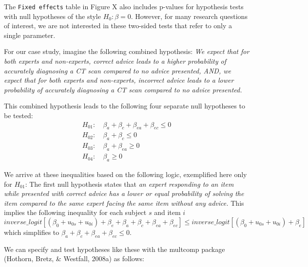 \documentclass[
  man,floatsintext]{apa6}
\newenvironment{Shaded}{\begin{snugshade}}{\end{snugshade}}
\newcommand{\AttributeTok}[1]{\textcolor[rgb]{0.13,0.29,0.53}{#1}}
\newcommand{\FunctionTok}[1]{\textcolor[rgb]{0.13,0.29,0.53}{\textbf{#1}}}
\newcommand{\NormalTok}[1]{#1}
\newcommand{\OtherTok}[1]{\textcolor[rgb]{0.56,0.35,0.01}{#1}}
\newcommand{\SpecialCharTok}[1]{\textcolor[rgb]{0.81,0.36,0.00}{\textbf{#1}}}
\newcommand{\StringTok}[1]{\textcolor[rgb]{0.31,0.60,0.02}{#1}}
\begin{document}
The \texttt{Fixed\ effects} table in Figure X also includes p-values for hypothesis tests with null hypotheses of the style \(H_0: \beta = 0\). However, for many research questions of interest, we are not interested in these two-sided tests that refer to only a single parameter.

For our case study, imagine the following combined hypothesis: \emph{We expect that for both experts and non-experts, correct advice leads to a higher probability of accurately diagnosing a CT scan compared to no advice presented, AND, we expect that for both experts and non-experts, incorrect advice leads to a lower probability of accurately diagnosing a CT scan compared to no advice presented.}

This combined hypothesis leads to the following four separate null hypotheses to be tested: \[
\begin{aligned}
H_{01}:\ &\beta_{a} + \beta_{c} + \beta_{ea} + \beta_{ec} \leq 0 \\
H_{02}:\ &\beta_{a} + \beta_{c} \leq 0 \\
H_{03}:\ &\beta_{a} + \beta_{ea} \geq 0 \\
H_{04}:\ &\beta_{a} \geq 0
\end{aligned}
\]

We arrive at these inequalities based on the following logic, exemplified here only for \(H_{01}\): The first null hypothesis states that \emph{an expert responding to an item while presented with correct advice has a lower or equal probability of solving the item compared to the same expert facing the same item without any advice.} This implies the following inequality for each subject \(s\) and item \(i\) \[
inverse\_logit[(\beta_0 + u_{0s} + u_{0i}) + \beta_e + \beta_{a} + \beta_{c} + \beta_{ea} + \beta_{ec}] \leq inverse\_logit[(\beta_0 + u_{0s} + u_{0i}) + \beta_e]
\] which simplifies to \(\beta_{a} + \beta_{c} + \beta_{ea} + \beta_{ec} \leq 0\).

We can specify and test hypotheses like these with the multcomp package (Hothorn, Bretz, \& Westfall, 2008a) as follows:

\begin{Shaded}
\end{Shaded}
\end{document}
